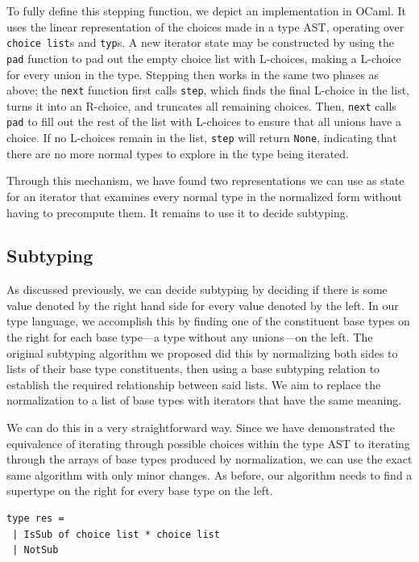 \documentclass[a4paper,english]{lipics-v2019}
\begin{document}
To fully define this stepping function, we depict an implementation in OCaml.
It uses the linear representation of the choices made in a type AST, operating
over \lstinline{choice list}s and \lstinline{typ}s. A new iterator state may
be constructed by using the \lstinline{pad} function to pad out the empty
choice list with L-choices, making a L-choice for every union in the type.
Stepping then works in the same two phases as above; the \lstinline{next}
function first calls \lstinline{step}, which finds the final L-choice in the
list, turns it into an R-choice, and truncates all remaining choices. Then,
\lstinline{next} calls \lstinline{pad} to fill out the rest of the list with
L-choices to ensure that all unions have a choice. If no L-choices remain in
the list, \lstinline{step} will return \lstinline{None}, indicating that there
are no more normal types to explore in the type being iterated.



Through this mechanism, we have found two representations we can use as state
for an iterator that examines every normal type in the normalized form without
having to precompute them. It remains to use it to decide subtyping.

\subsection{Subtyping}

As discussed previously, we can decide subtyping by deciding if there is some
value denoted by the right hand side for every value denoted by the left. In
our type language, we accomplish this by finding one of the constituent base
types  on the right for each base type---a type without any unions---on the
left. The original subtyping algorithm  we proposed did this by normalizing
both sides to lists of their base type constituents, then using a base
subtyping relation to establish the  required relationship between said lists.
We aim to replace the normalization to a list of base types with iterators
that have the same meaning.

We can do this in a very straightforward way. Since we have demonstrated the
equivalence of iterating through possible choices within the type AST to
iterating through the arrays of base types produced by normalization, we can
use the exact same algorithm with only minor changes. As before, our algorithm
needs to find a supertype on the right for every base type on the left.


\begin{lstlisting}
type res =
 | IsSub of choice list * choice list
 | NotSub
\end{lstlisting}
\end{document}
